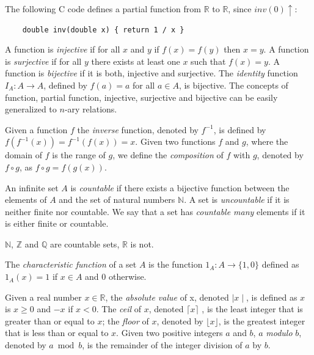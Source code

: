 \begin{example}
The following C code defines a partial function from $\mathbb{R}$ to $\mathbb{R}$, since $inv(0)\uparrow$:
\begin{verbatim}
    double inv(double x) { return 1 / x }
\end{verbatim}
\end{example}

A function is \emph{injective} if for all $x$ and $y$ if $f(x) = f(y)$ then $x=y$. A function is \emph{surjective} if for all $y$ there exists at least one $x$ such that $f(x) = y$. A function is \emph{bijective} if it is both, injective and surjective. The \emph{identity} function $I_A : A \rightarrow A$, defined by $f(a) = a$ for all $a \in A$, is bijective. The concepts of function, partial function, injective, surjective and bijective can be easily generalized to $n$-ary relations.

Given a function $f$ the \emph{inverse} function, denoted by $f^{-1}$, is defined by $f(f^{-1}(x)) = f^{-1}(f(x)) = x$. Given two functions $f$ and $g$, where the domain of $f$ is the range of $g$, we define the \emph{composition} of $f$ with $g$, denoted by $f \circ g$, as $f \circ g = f(g(x))$.

An infinite set $A$ is \emph{countable} if there exists a bijective function between the elements of $A$ and the set of natural numbers $\mathbb{N}$. A set is \emph{uncountable} if it is neither finite nor countable. We say that a set has \emph{countable many} elements if it is either finite or countable.

\begin{example}
$\mathbb{N}$, $\mathbb{Z}$ and $\mathbb{Q}$ are countable sets, $\mathbb{R}$ is not.
\end{example}

The \emph{characteristic function} of a set $A$ is the function $1_A : A \rightarrow \{1, 0\}$ defined as $1_A(x) = 1$ if $x \in A$ and $0$ otherwise.

Given a real number $x \in \mathbb{R}$, the \emph{absolute value} of x, denoted $\mid x \mid$, is defined as $x$ is $x \geq 0$ and $-x$ if $x < 0$. The \emph{ceil} of $x$, denoted $\lceil x \rceil$ , is the least integer that is greater than or equal to $x$; the \emph{floor} of $x$, denoted by $\lfloor x \rfloor$, is the greatest integer that is less than or equal to $x$. Given two positive integers $a$ and $b$, $a$ \emph{modulo} $b$, denoted by $a \bmod b$, is the remainder of the integer division of $a$ by $b$.

